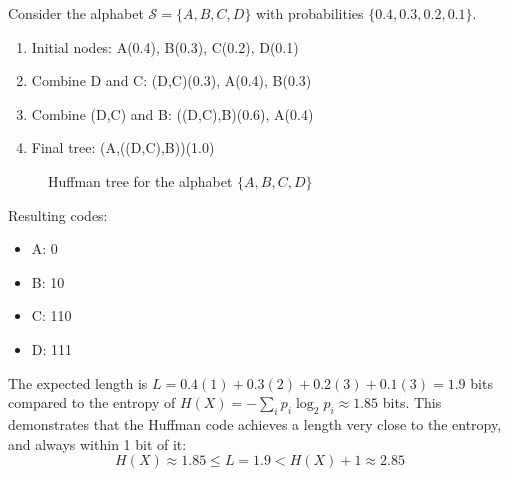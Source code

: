 \documentclass{article}
\begin{document}
    \begin{example}
      Consider the alphabet $\mathcal{S} = \{A, B, C, D\}$ with probabilities $\{0.4, 0.3, 0.2, 0.1\}$.

      \begin{enumerate}
        \item Initial nodes: A(0.4), B(0.3), C(0.2), D(0.1)
        \item Combine D and C: (D,C)(0.3), A(0.4), B(0.3)
        \item Combine (D,C) and B: ((D,C),B)(0.6), A(0.4)
        \item Final tree: (A,((D,C),B))(1.0)
      \end{enumerate}

      \begin{figure}[H]
        \centering
        \caption{Huffman tree for the alphabet $\{A, B, C, D\}$}
        \label{fig:huffman_tree}
      \end{figure}

      Resulting codes:
      \begin{itemize}
        \item A: 0
        \item B: 10
        \item C: 110
        \item D: 111
      \end{itemize}

      The expected length is $L = 0.4(1) + 0.3(2) + 0.2(3) + 0.1(3) = 1.9$ bits compared to the entropy of $H(X) = -\sum_{i} p_i \log_2 p_i \approx 1.85$ bits. This demonstrates that the Huffman code achieves a length very close to the entropy, and always within 1 bit of it:
      \begin{equation}
        H(X) \approx 1.85 \leq L = 1.9 < H(X) + 1 \approx 2.85
      \end{equation}
    \end{example}
\end{document}
